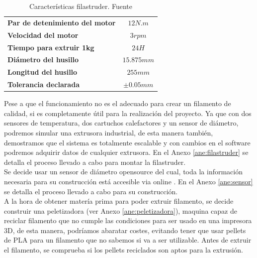 \begin{table}[H]
    \centering

        \begin{tabular}{lc}
        \textbf{Par de detenimiento del motor}            & $12N.m$                           \\
        \textbf{Velocidad del motor}                      & $3 rpm$                           \\
        \textbf{Tiempo para extruir 1kg}                  & $24H$                             \\
        \textbf{Diámetro del husillo}                     & $15.875mm$                        \\
        \textbf{Longitud del husillo}                     & $255mm$                           \\
        \textbf{Tolerancia declarada}                     & $\pm 0.05 mm$                     \\   

    \end{tabular}
    \caption[Características filastruder.]{Características filastruder. Fuente\cite{tfg_diego}}
    \label{tab:caract_filas}
\end{table}

Pese a que el funcionamiento no es el adecuado para crear un filamento de calidad, si es completamente útil para la realización del proyecto. Ya que con dos sensores de temperatura, dos cartuchos calefactores y un sensor de diámetro, podremos simular una extrusora industrial, de esta manera también, demostramos que el sistema es totalmente escalable y con cambios en el software podremos adquirir datos de cualquier extrusora. En el Anexo \ref{ane:filastruder} se detalla el proceso llevado a cabo para montar la filastruder.\\

Se decide usar un sensor de diámetro opensource del cual, toda la información necesaria para su construcción está accesible via online \cite{thing_filamento}. En el Anexo \ref{ane:sensor} se detalla el proceso llevado a cabo para su construcción.\\

A la hora de obtener matería prima para poder extruir filamento, se decide construir una peletizadora (ver Anexo \ref{ane:peletizadora}), maquina capaz de reciclar filamento que no cumple las condiciones para ser usado en una impresora 3D, de esta manera, podríamos abaratar costes, evitando tener que usar pellets de PLA para un filamento que no sabemos si va a ser utilizable. Antes de extruir el filamento, se comprueba si los pellets reciclados son aptos para la extrusión.\\

